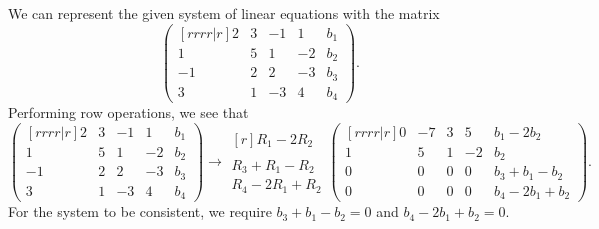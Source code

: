 \begin{solution}
\begin{ppart}
        We can represent the given system of linear equations with the matrix \[\begin{pmatrix}[rrrr|r]2 & 3 & -1 & 1 & b_1 \\ 1 & 5 & 1 & -2 & b_2 \\ -1 & 2 & 2 & -3 & b_3 \\ 3 & 1 & -3 & 4 & b_4\end{pmatrix}.\] Performing row operations, we see that \[\begin{pmatrix}[rrrr|r]2 & 3 & -1 & 1 & b_1 \\ 1 & 5 & 1 & -2 & b_2 \\ -1 & 2 & 2 & -3 & b_3 \\ 3 & 1 & -3 & 4 & b_4\end{pmatrix} \rightarrow \begin{matrix}[r]\scriptstyle R_1 - 2R_2 \\ \\ \scriptstyle R_3 + R_1 - R_2 \\ \scriptstyle R_4 - 2R_1 + R_2 \end{matrix}\begin{pmatrix}[rrrr|r]0 & -7 & 3 & 5 & b_1 - 2b_2 \\ 1 & 5 & 1 & -2 & b_2 \\ 0 & 0 & 0 & 0 & b_3 + b_1 - b_2 \\ 0 & 0 & 0 & 0 & b_4 - 2b_1 + b_2\end{pmatrix}.\] For the system to be consistent, we require $b_3 + b_1 - b_2 = 0$ and $b_4 - 2b_1 + b_2 = 0$.
    \end{ppart}
\end{solution}

